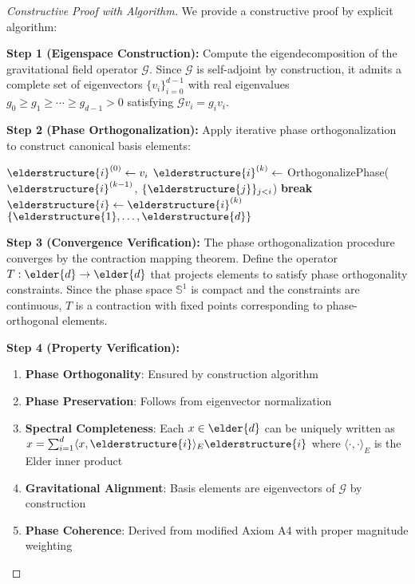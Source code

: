 \begin{proof}[Constructive Proof with Algorithm]
We provide a constructive proof by explicit algorithm:

\textbf{Step 1 (Eigenspace Construction):} 
Compute the eigendecomposition of the gravitational field operator $\mathcal{G}$. Since $\mathcal{G}$ is self-adjoint by construction, it admits a complete set of eigenvectors $\{v_i\}_{i=0}^{d-1}$ with real eigenvalues $g_0 \geq g_1 \geq \cdots \geq g_{d-1} > 0$ satisfying $\mathcal{G}v_i = g_i v_i$.

\textbf{Step 2 (Phase Orthogonalization):}
Apply iterative phase orthogonalization to construct canonical basis elements:
\begin{algorithm}[H]
\begin{algorithmic}[1]
        \State $\elderstructure{i}^{(0)} \leftarrow v_i$ 
            \State $\elderstructure{i}^{(k)} \leftarrow$ OrthogonalizePhase($\elderstructure{i}^{(k-1)}$, $\{\elderstructure{j}\}_{j<i}$)
                \State \textbf{break} 
            \EndIf
        \EndFor
        \State $\elderstructure{i} \leftarrow \elderstructure{i}^{(k)}$
    \EndFor
    \State \Return $\{\elderstructure{1}, \ldots, \elderstructure{d}\}$
\EndProcedure
\end{algorithmic}
\end{algorithm}

\textbf{Step 3 (Convergence Verification):}
The phase orthogonalization procedure converges by the contraction mapping theorem. Define the operator $T: \elder{d} \rightarrow \elder{d}$ that projects elements to satisfy phase orthogonality constraints. Since the phase space $\mathbb{S}^1$ is compact and the constraints are continuous, $T$ is a contraction with fixed points corresponding to phase-orthogonal elements.

\textbf{Step 4 (Property Verification):}
\begin{enumerate}
    \item \textbf{Phase Orthogonality}: Ensured by construction algorithm
    \item \textbf{Phase Preservation}: Follows from eigenvector normalization
    \item \textbf{Spectral Completeness}: Each $x \in \elder{d}$ can be uniquely written as $x = \sum_{i=1}^{d} \langle x, \elderstructure{i} \rangle_E \elderstructure{i}$ where $\langle \cdot, \cdot \rangle_E$ is the Elder inner product
    \item \textbf{Gravitational Alignment}: Basis elements are eigenvectors of $\mathcal{G}$ by construction
    \item \textbf{Phase Coherence}: Derived from modified Axiom A4 with proper magnitude weighting
\end{enumerate}


\end{proof}
